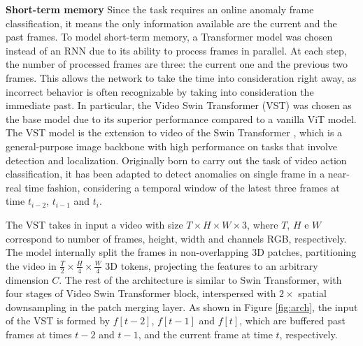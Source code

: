 \noindent\textbf{Short-term memory}
Since the task requires an online anomaly frame classification, it means the only information available are the current and the past frames.
To model short-term memory, a Transformer model was chosen instead of an RNN due to its ability to process frames in parallel.
At each step, the number of processed frames are three: the current one and the previous two frames. 
This allows the network to take the time into consideration right away, as incorrect behavior is often recognizable by taking into consideration the immediate past.
In particular, the Video Swin Transformer (VST) \cite{liu_video_2022} was chosen as the base model due to its superior performance compared to a vanilla ViT \cite{DBLP:conf/iclr/DosovitskiyB0WZ21} model.
The VST model is the extension to video of the Swin Transformer \cite{liu2021Swin}, which is a general-purpose image backbone with high performance on tasks that involve detection and localization.
Originally born to carry out the task of video action classification, it has been adapted to detect anomalies on single frame in a near-real time fashion, considering a temporal window of the latest three frames at time $t_{i-2}$, $t_{i-1}$ and $t_{i}$.

The VST takes in input a video with size $T \times H \times W \times 3$, where $T$, $H$ e $W$ correspond to number of frames, height, width and channels RGB, respectively.
The model internally split the frames in non-overlapping 3D patches, partitioning the video in $\frac{T}{2} \times \frac{H}{4} \times \frac{W}{4}$ 3D tokens, projecting the features to an arbitrary dimension $C$.
The rest of the architecture is similar to Swin Transformer, with four stages of Video Swin Transformer block, interspersed with $2\times$ spatial downsampling in the patch merging layer.
As shown in Figure \ref{fig:arch}, the input of the VST is formed by $f[t-2]$, $f[t-1]$ and $f[t]$, which are buffered past frames at times $t-2$ and $t-1$, and the current frame at time $t$, respectively.

